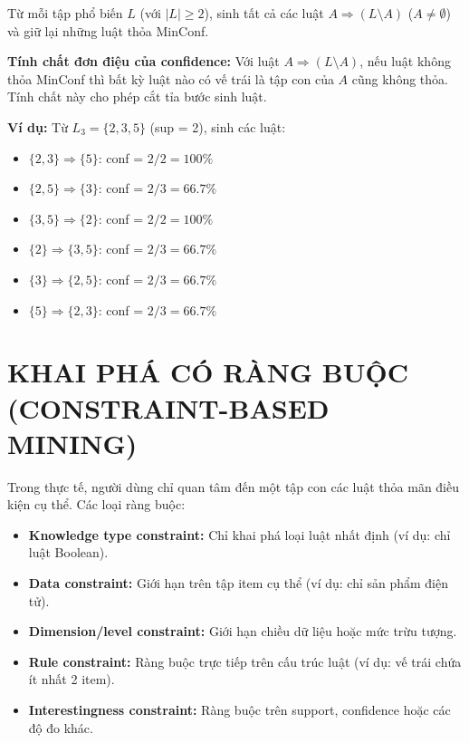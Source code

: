 \documentclass[10pt]{article}
\begin{document}
Từ mỗi tập phổ biến $L$ (với $|L| \geq 2$), sinh tất cả các luật $A \Rightarrow (L \setminus A)$ ($A \neq \emptyset$) và giữ lại những luật thỏa MinConf.

\textbf{Tính chất đơn điệu của confidence:} Với luật $A \Rightarrow (L \setminus A)$, nếu luật không thỏa MinConf thì bất kỳ luật nào có vế trái là tập con của $A$ cũng không thỏa. Tính chất này cho phép cắt tỉa bước sinh luật.

\textbf{Ví dụ:} Từ $L_3 = \{2, 3, 5\}$ (sup = 2), sinh các luật:
\begin{itemize}
    \item $\{2,3\} \Rightarrow \{5\}$: conf = $2/2 = 100\%$
    \item $\{2,5\} \Rightarrow \{3\}$: conf = $2/3 = 66.7\%$
    \item $\{3,5\} \Rightarrow \{2\}$: conf = $2/2 = 100\%$
    \item $\{2\} \Rightarrow \{3,5\}$: conf = $2/3 = 66.7\%$
    \item $\{3\} \Rightarrow \{2,5\}$: conf = $2/3 = 66.7\%$
    \item $\{5\} \Rightarrow \{2,3\}$: conf = $2/3 = 66.7\%$
\end{itemize}

\section{KHAI PHÁ CÓ RÀNG BUỘC (CONSTRAINT-BASED MINING)}

Trong thực tế, người dùng chỉ quan tâm đến một tập con các luật thỏa mãn điều kiện cụ thể. Các loại ràng buộc:

\begin{itemize}
    \item \textbf{Knowledge type constraint:} Chỉ khai phá loại luật nhất định (ví dụ: chỉ luật Boolean).
    \item \textbf{Data constraint:} Giới hạn trên tập item cụ thể (ví dụ: chỉ sản phẩm điện tử).
    \item \textbf{Dimension/level constraint:} Giới hạn chiều dữ liệu hoặc mức trừu tượng.
    \item \textbf{Rule constraint:} Ràng buộc trực tiếp trên cấu trúc luật (ví dụ: vế trái chứa ít nhất 2 item).
    \item \textbf{Interestingness constraint:} Ràng buộc trên support, confidence hoặc các độ đo khác.
\end{itemize}
\end{document}
